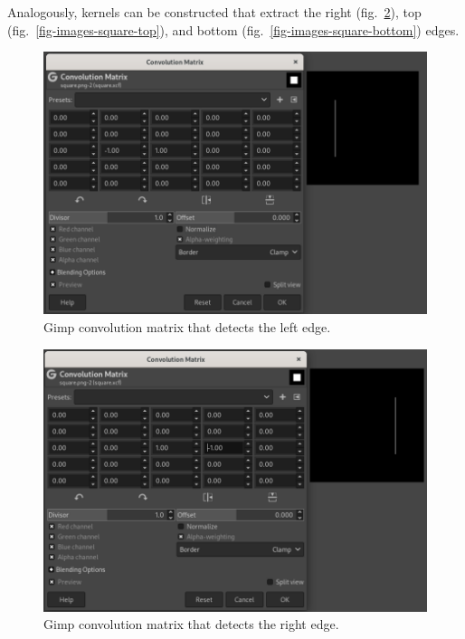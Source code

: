 \documentclass[
  letterpaper,
]{krantz}
\begin{document}
Analogously, kernels can be constructed that extract the right
(fig.~\ref{fig-images-square-right}), top
(fig.~\ref{fig-images-square-top}), and bottom
(fig.~\ref{fig-images-square-bottom}) edges.

\begin{figure}[H]

{\centering \includegraphics{images/images-square-left.png}

}

\caption{\label{fig-images-square-left}Gimp convolution matrix that
detects the left edge.}

\end{figure}

\begin{figure}[H]

{\centering \includegraphics{images/images-square-right.png}

}

\caption{\label{fig-images-square-right}Gimp convolution matrix that
detects the right edge.}

\end{figure}
\end{document}
